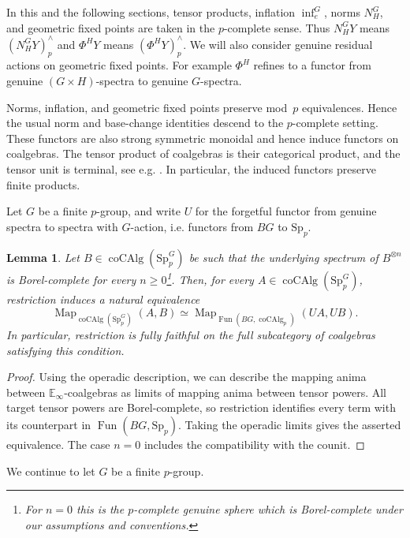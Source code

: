 \documentclass[11pt,a4paper]{article}
\newtheorem{lemma}[thm]{Lemma}
\theoremstyle{definition}
\newcommand{\Sp}{\mathrm{Sp}}
\newcommand{\coAlg}{\operatorname{coCAlg}}
\newcommand{\Map}{\operatorname{Map}}
\newcommand{\Fun}{\operatorname{Fun}}
\newcommand{\infl}{\operatorname{inf}}
\begin{document}
In this and the following sections, tensor products, inflation
$\infl_e^G$, norms $N_H^G$, and geometric
fixed points are taken in the $p$-complete sense.
Thus $N_H^G Y$ means  $(N_H^G Y)^\wedge_p$ and $\Phi^HY$ means $(\Phi^HY)^\wedge_p$.
We will also  consider genuine residual actions on geometric fixed points. For example  $\Phi^H$ refines to a functor from genuine $(G\times H)$-spectra to
genuine $G$-spectra.

Norms, inflation, and geometric fixed points preserve mod~$p$
equivalences. Hence the usual norm and base-change identities
\cite[\S9.2]{BH} descend to the $p$-complete setting. 
These  functors are also strong symmetric monoidal and hence induce
functors on coalgebras. The tensor product of coalgebras is their
categorical product, and the tensor unit is terminal, see e.g.
\cite[\S2]{BB}. In particular, the induced functors preserve
finite products.

Let $G$ be a finite $p$-group, and write $U$ for the forgetful functor from
genuine spectra to spectra with $G$-action, i.e. functors from $BG$ to $\Sp_p$. 
\begin{lemma}\label{lem:borel-comparison}
Let $B\in\coAlg(\Sp_p^G)$ be such
that the underlying spectrum of $B^{\otimes n}$ is Borel-complete
for every $n\ge0$\footnote{For $n=0$ this is the $p$-complete genuine sphere which is Borel-complete under our assumptions and conventions.}.
Then, for every $A\in\coAlg(\Sp_p^G)$,
restriction induces a natural equivalence
\begin{equation*}
 \Map_{\coAlg(\Sp_p^G)}(A,B)
 \simeq
 \Map_{\Fun(BG,\coAlg_p)}(UA,UB).
\end{equation*}
In particular, restriction is fully faithful on the full subcategory
of coalgebras satisfying this condition.
\end{lemma}
\begin{proof}
Using the operadic description, we can describe the mapping anima between $\mathbb{E}_\infty$-coalgebras as limits of mapping anima between tensor powers.
All target tensor powers are Borel-complete, so restriction
identifies every term with its counterpart in $\Fun(BG,\Sp_p)$.
Taking the operadic limits gives the asserted equivalence.
The case $n=0$ includes the compatibility with the counit.
\end{proof}

We continue to let $G$ be a finite $p$-group.
\end{document}
